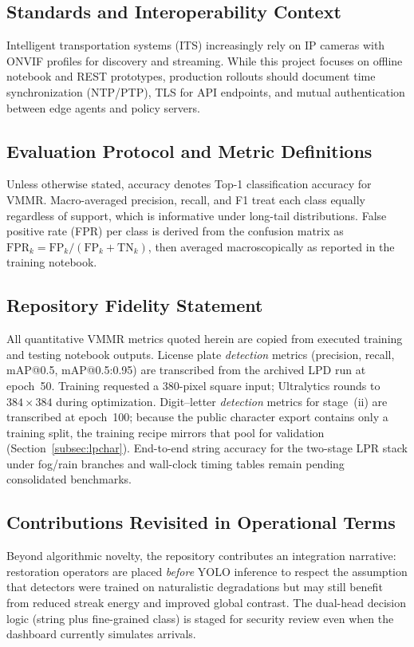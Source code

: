 \subsection{Standards and Interoperability Context}
Intelligent transportation systems (ITS) increasingly rely on IP cameras with ONVIF profiles for discovery and streaming. While this project focuses on offline notebook and REST prototypes, production rollouts should document time synchronization (NTP/PTP), TLS for API endpoints, and mutual authentication between edge agents and policy servers.

\subsection{Evaluation Protocol and Metric Definitions}
Unless otherwise stated, accuracy denotes Top-1 classification accuracy for VMMR. Macro-averaged precision, recall, and F1 treat each class equally regardless of support, which is informative under long-tail distributions. False positive rate (FPR) per class is derived from the confusion matrix as $\mathrm{FPR}_k = \mathrm{FP}_k / (\mathrm{FP}_k + \mathrm{TN}_k)$, then averaged macroscopically as reported in the training notebook.

\subsection{Repository Fidelity Statement}
All quantitative VMMR metrics quoted herein are copied from executed training and testing notebook outputs. License plate \emph{detection} metrics (precision, recall, mAP@0.5, mAP@0.5:0.95) are transcribed from the archived LPD run at epoch~50. Training requested a 380-pixel square input; Ultralytics rounds to $384\times384$ during optimization. Digit--letter \emph{detection} metrics for stage~(ii) are transcribed at epoch~100; because the public character export contains only a training split, the training recipe mirrors that pool for validation (Section~\ref{subsec:lpchar}). End-to-end string accuracy for the two-stage LPR stack under fog/rain branches and wall-clock timing tables remain pending consolidated benchmarks.

\subsection{Contributions Revisited in Operational Terms}
Beyond algorithmic novelty, the repository contributes an integration narrative: restoration operators are placed \emph{before} YOLO inference to respect the assumption that detectors were trained on naturalistic degradations but may still benefit from reduced streak energy and improved global contrast. The dual-head decision logic (string plus fine-grained class) is staged for security review even when the dashboard currently simulates arrivals.

